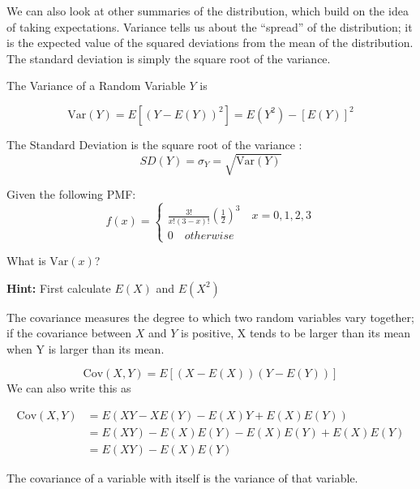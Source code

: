 \documentclass[
]{book}
\begin{document}
We can also look at other summaries of the distribution, which build on the idea of taking expectations. Variance tells us about the ``spread'' of the distribution; it is the expected value of the squared deviations from the mean of the distribution. The standard deviation is simply the square root of the variance.

\begin{definition}[Variance]
\protect\hypertarget{def:unnamed-chunk-84}{}\label{def:unnamed-chunk-84}The Variance of a Random Variable \(Y\) is

\[\text{Var}(Y) = E[(Y - E(Y))^2] =  E(Y^2)-[E(Y)]^2\]

The Standard Deviation is the square root of the variance : \[SD(Y) = \sigma_Y= \sqrt{\text{Var}(Y)}\]
\end{definition}

\begin{example}[Variance]
\protect\hypertarget{exm:var}{}\label{exm:var}Given the following PMF:
\[f(x) =  \begin{cases}
              \frac{3!}{x!(3-x)!}(\frac{1}{2})^3 \quad x = 0,1,2,3\\
               0 \quad otherwise
            \end{cases}
               \]

What is \(\text{Var}(x)\)?

\textbf{Hint:} First calculate \(E(X)\) and \(E(X^2)\)
\end{example}

\begin{definition}
\protect\hypertarget{def:unnamed-chunk-85}{}\label{def:unnamed-chunk-85}The covariance measures the degree to which two random variables vary together; if the covariance between \(X\) and \(Y\) is positive, X tends to be larger than its mean when Y is larger than its mean.

\[\text{Cov}(X,Y) = E[(X - E(X))(Y - E(Y))] \]
We can also write this as

\begin{align*}
\text{Cov}(X,Y) &= E\left(XY - XE(Y) - E(X)Y + E(X)E(Y)\right)\\
&= E(XY) - E(X)E(Y) - E(X)E(Y) + E(X)E(Y)\\
&= E(XY) - E(X)E(Y)
\end{align*}
\end{definition}

The covariance of a variable with itself is the variance of that variable.
\end{document}
